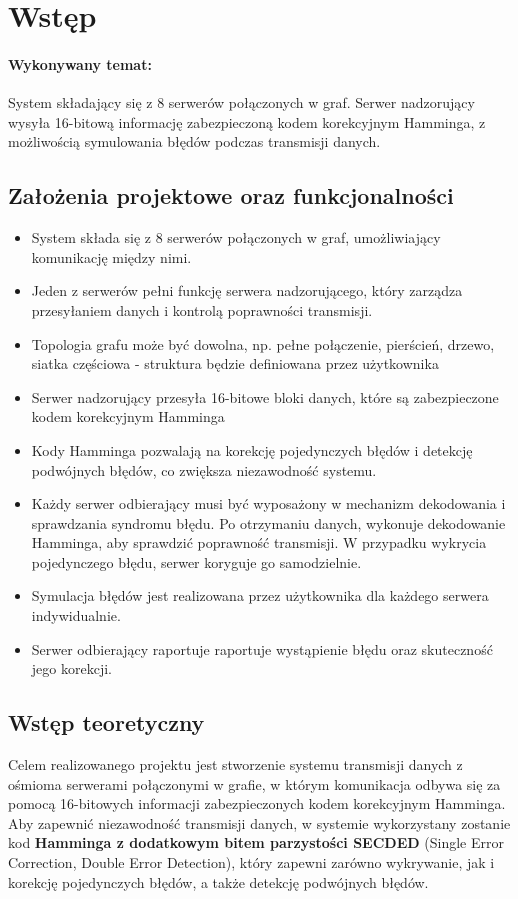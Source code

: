 \section{Wstęp}
\paragraph{Wykonywany temat:} System składający się z 8 serwerów połączonych w graf. Serwer nadzorujący wysyła 16-bitową informację zabezpieczoną kodem korekcyjnym Hamminga, z możliwością symulowania błędów podczas transmisji danych.

\subsection{Założenia projektowe oraz funkcjonalności}
\begin{itemize}
	\item System składa się z 8 serwerów połączonych w graf, umożliwiający komunikację między nimi.
	\item Jeden z serwerów pełni funkcję serwera nadzorującego, który zarządza przesyłaniem danych i kontrolą poprawności transmisji.
	\item Topologia grafu może być dowolna, np. pełne połączenie, pierścień, drzewo, siatka częściowa - struktura będzie definiowana przez użytkownika
	\item Serwer nadzorujący przesyła 16-bitowe bloki danych, które są zabezpieczone kodem korekcyjnym Hamminga 
	\item Kody Hamminga pozwalają na korekcję pojedynczych błędów i detekcję podwójnych błędów, co zwiększa niezawodność systemu.
	\item Każdy serwer odbierający musi być wyposażony w mechanizm dekodowania i sprawdzania syndromu błędu. Po otrzymaniu danych, wykonuje dekodowanie Hamminga, aby sprawdzić poprawność transmisji. W przypadku wykrycia pojedynczego błędu, serwer koryguje go samodzielnie.
	\item Symulacja błędów jest realizowana przez użytkownika dla każdego serwera indywidualnie.
	\item Serwer odbierający raportuje raportuje wystąpienie błędu oraz skuteczność jego korekcji.
\end{itemize}

\subsection{Wstęp teoretyczny}
Celem realizowanego projektu jest stworzenie systemu transmisji danych z ośmioma serwerami połączonymi w grafie, w którym komunikacja odbywa się za pomocą 16-bitowych informacji zabezpieczonych kodem korekcyjnym Hamminga. Aby zapewnić niezawodność transmisji danych, w systemie wykorzystany zostanie kod \textbf{Hamminga z dodatkowym bitem parzystości SECDED} (Single Error Correction, Double Error Detection), który zapewni zarówno wykrywanie, jak i korekcję pojedynczych błędów, a także detekcję podwójnych błędów. 

